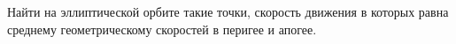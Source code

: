 Найти на эллиптической орбите такие точки, скорость движения в которых равна среднему геометрическому скоростей в перигее
и апогее.